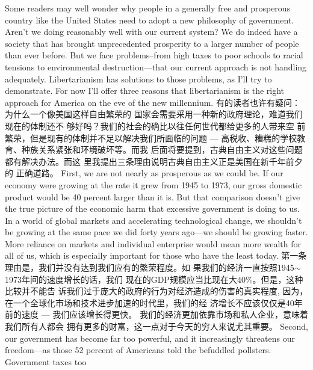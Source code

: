 \begin{paracol}{2}
Some readers may well wonder why people in a generally free
and prosperous country like the United States need to adopt a
new philosophy of government. Aren't we doing reasonably
well with our current system? We do indeed have a society that
has brought unprecedented prosperity to a larger number of
people than ever before. But we face problems--from high
taxes to poor schools to racial tensions to environmental destruction---that our current approach is not handling adequately. Libertarianism has solutions to those problems, as I'll
try to demonstrate. For now I'll offer three reasons that libertarianism is the right approach for America on the eve of the new millennium.
\switchcolumn
有的读者也许有疑问：为什么一个像美国这样自由繁荣的
国家会需要采用一种新的政府理论，难道我们现在的体制还不
够好吗？我们的社会的确比以往任何世代都给更多的人带来空
前繁荣，但是现有的体制并不足以解决我们所面临的问题 ---
高税收、糟糕的学校教育、种族关系紧张和环境破坏等。而我
后面将要提到，古典自由主义对这些问题都有解决办法。而这
里我提出三条理由说明古典自由主义正是美国在新千年前夕的
正确道路。
\switchcolumn*
First, we are not nearly as prosperous as we could be. If our
economy were growing at the rate it grew from 1945 to 1973,
our gross domestic product would be 40 percent larger than it
is. But that comparison doesn't give the true picture of the economic harm that excessive government is doing to us. In a
world of global markets and accelerating technological change,
we shouldn't be growing at the same pace we did forty years
ago---we should be growing faster. More reliance on markets
and individual enterprise would mean more wealth for all of us,
which is especially important for those who have the least today.
\switchcolumn
第一条理由是，我们并没有达到我们应有的繁荣程度。如
果我们的经济一直按照1945$\sim$1973年间的速度增长的话，我们
现在的GDP规模应当比现在大40\%。但是，这种比较并不能告
诉我们过于庞大的政府的行为对经济造成的伤害的真实程度,
因为，在一个全球化市场和技术进步加速的时代里，我们的经
济增长不应该仅仅是40年前的速度 --- 我们应该增长得更快。
我们的经济更加依靠市场和私人企业，意味着我们所有人都会
拥有更多的财富，这一点对于今天的穷人来说尤其重要。
\switchcolumn*
Second, our government has become far too powerful, and it
increasingly threatens our freedom---as those 52 percent of
Americans told the befuddled pollsters. Government taxes too

\end{paracol}
